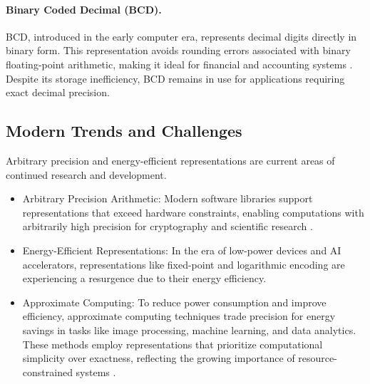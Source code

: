 \paragraph{Binary Coded Decimal (BCD).}
BCD, introduced in the early computer era, represents decimal digits directly in binary form. This representation avoids rounding errors associated with binary floating-point arithmetic, making it ideal for financial and accounting systems \cite{randell1982origins}. Despite its storage inefficiency, BCD remains in use for applications requiring exact decimal precision.

\subsection{Modern Trends and Challenges}
Arbitrary precision and energy-efficient representations are current areas of continued research and development.

\begin{itemize}
    \item Arbitrary Precision Arithmetic: Modern software libraries support representations that exceed hardware constraints, enabling computations with arbitrarily high precision for cryptography and scientific research \cite{smith1997science}.
    \item Energy-Efficient Representations: In the era of low-power devices and AI accelerators, representations like fixed-point and logarithmic encoding are experiencing a resurgence due to their energy efficiency.
    \item Approximate Computing: To reduce power consumption and improve efficiency, approximate computing techniques trade precision for energy savings in tasks like image processing, machine learning, and data analytics. These methods employ representations that prioritize computational simplicity over exactness, reflecting the growing importance of resource-constrained systems \cite{han2013approximate}.
\end{itemize}